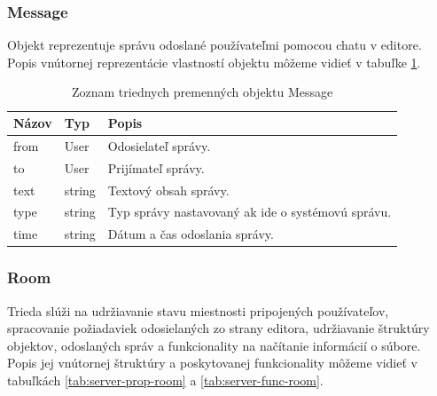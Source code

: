 \subsubsection{Message}
Objekt  reprezentuje správu odoslané používateľmi pomocou chatu v editore. Popis vnútornej reprezentácie vlastností objektu môžeme vidieť v tabuľke \ref{tab:server-prop-message}.

\begin{table}
	\begin{tabular}{ | m{3cm} | m{3cm}| m{6.5cm} | } \hline
		\textbf{Názov} & \textbf{Typ} & \textbf{Popis} \\ \hline \hline
		
		from & User & Odosielateľ správy. \\\hline
		to & User & Prijímateľ správy. \\\hline
		text & string & Textový obsah správy. \\\hline
		type & string & Typ správy nastavovaný ak ide o systémovú správu. \\\hline
		time & string & Dátum a čas odoslania správy. \\	\hline
	
		\hline
	\end{tabular}
	\caption{Zoznam triednych premenných objektu Message}
	\label{tab:server-prop-message}
\end{table}



\subsubsection{Room}
Trieda  slúži na udržiavanie stavu miestnosti pripojených používateľov, spracovanie požiadaviek odosielaných zo strany editora, udržiavanie štruktúry objektov, odoslaných správ a funkcionality na načítanie informácií o súbore. Popis jej vnútornej štruktúry a poskytovanej funkcionality môžeme vidieť v tabuľkách \ref{tab:server-prop-room} a \ref{tab:server-func-room}.


